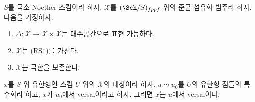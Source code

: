 \begin{lemma}
\label{lemma-generalization-versality}
$S$를 국소 Noether 스킴이라 하자. $\mathcal{X}$를
$(\Sch/S)_{fppf}$ 위의 준군 섬유화 범주라 하자. 다음을 가정하자.
\begin{enumerate}
\item $\Delta : \mathcal{X} \to \mathcal{X} \times \mathcal{X}$는
대수공간으로 표현 가능하다.
\item $\mathcal{X}$는 (RS*)를 가진다.
\item $\mathcal{X}$는 극한을 보존한다.
\end{enumerate}
$x$를 $S$ 위 유한형인 스킴 $U$ 위의 $\mathcal{X}$의 대상이라 하자.
$u \leadsto u_0$를 $U$의 유한형 점들의 특수화라 하고,
$x$가 $u_0$에서 versal이라고 하자. 그러면 $x$는 $u$에서 versal이다.
\end{lemma}

